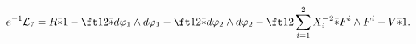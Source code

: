 \begin{equation}
e^{-1}{\cal L}_7 = R\bar *1-\ft12\bar*d\varphi_1\wedge d\varphi_1
-\ft12\bar*d\varphi_2\wedge d\varphi_2 
-\ft12\sum_{i=1}^2 X_i^{-2}\bar*F^i\wedge F^i-V\bar*1.
\label{eq:d7n2lag}
\end{equation}

